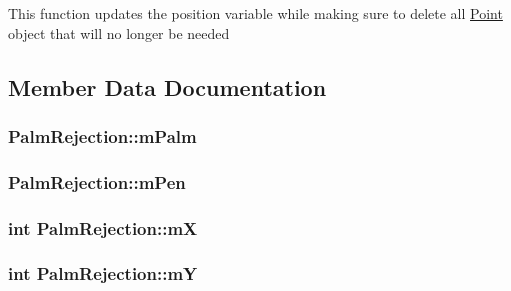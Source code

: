 This function updates the position variable while making sure to delete all \hyperlink{classPoint}{Point} object that will no longer be needed 

\subsection{Member Data Documentation}
\hypertarget{classPalmRejection_a037353747681e2cd2c74e49059b4cbec}{
\subsubsection[{mPalm}]{ {\bf PalmRejection::mPalm}}}
\label{classPalmRejection_a037353747681e2cd2c74e49059b4cbec}
\hypertarget{classPalmRejection_a0a6801e29187ae5fef583227e68fec07}{
\subsubsection[{mPen}]{ {\bf PalmRejection::mPen}}}
\label{classPalmRejection_a0a6801e29187ae5fef583227e68fec07}
\hypertarget{classPalmRejection_a569d496191e767a5c46914c2552da635}{
\subsubsection[{mX}]{\setlength{\rightskip}{0pt plus 5cm}int {\bf PalmRejection::mX}}}
\label{classPalmRejection_a569d496191e767a5c46914c2552da635}
\hypertarget{classPalmRejection_a13ff8711ff678910f89b5a42a5659c32}{
\subsubsection[{mY}]{\setlength{\rightskip}{0pt plus 5cm}int {\bf PalmRejection::mY}}}
